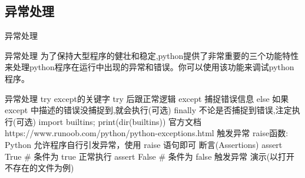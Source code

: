 \subsection{异常处理}
\begin{frame}[standout] 异常处理 \end{frame}
\begin{frame}{异常处理}
    \tiny{为了保持大型程序的健壮和稳定,python提供了非常重要的三个功能特性来处理python程序在运行中出现的异常和错误。你可以使用该功能来调试python程序。}

    \begin{myoutline}
        \1 异常处理
            \2 try except的关键字
                \3 try 后跟正常逻辑
                \3 except 捕捉错误信息
                \3 else 如果 except 中描述的错误没捕捉到,就会执行(可选)
                \3 finally 不论是否捕捉到错误,注定执行(可选)
            \2 import builtins; print(dir(builtins))
                \3 官方文档
                \3 https://www.runoob.com/python/python-exceptions.html
        \1 触发异常
            \2 raise函数: Python 允许程序自行引发异常，使用 raise 语句即可
        \1 断言(Assertions)
            \2 assert True     \# 条件为 true 正常执行
            \2 assert False    \# 条件为 false 触发异常
        \1 演示(以打开不存在的文件为例)
    \end{myoutline}
\end{frame}